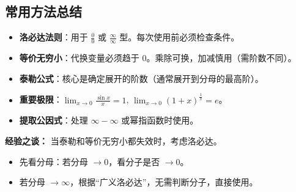 \documentclass[a4paper,12pt]{ctexart} %
\newenvironment{purplebox}
  {\begin{tcolorbox}[colback=white, colframe=boxpurple, boxrule=1pt, sharp corners, title=\textbf{定义/定理}]}
  {\end{tcolorbox}}
\begin{document}
\subsection{常用方法总结}
\begin{itemize}
    \item \textbf{洛必达法则}：用于 $\frac{0}{0}$ 或 $\frac{\infty}{\infty}$ 型。每次使用前必须检查条件。
    \item \textbf{等价无穷小}：代换变量必须趋于 0。乘除可换，加减慎用（需阶数不同）。
    \item \textbf{泰勒公式}：核心是确定展开的阶数（通常展开到分母的最高阶）。
    \item \textbf{重要极限}：$\lim_{x \to 0} \frac{\sin x}{x} = 1$, $\lim_{x \to 0} (1+x)^{\frac{1}{x}} = e$。
    \item \textbf{提取公因式}：处理 $\infty - \infty$ 或幂指函数时使用。
\end{itemize}

\begin{purplebox}
    \textbf{经验之谈：}
    当泰勒和等价无穷小都失效时，考虑洛必达。
    \begin{itemize}
        \item 先看分母：若分母 $\to 0$，看分子是否 $\to 0$。
        \item 若分母 $\to \infty$，根据“广义洛必达”，无需判断分子，直接使用。
    \end{itemize}
\end{purplebox}
\end{document}
